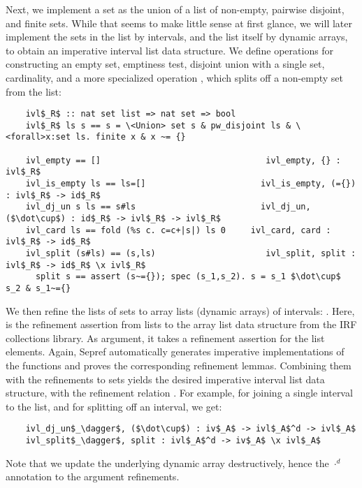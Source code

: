 \documentclass[sn-mathphys,Numbered]{sn-jnl}
\theoremstyle{thmstyleone}%
\theoremstyle{definition}%
\theoremstyle{thmstylethree}%
\begin{document}
  Next, we implement a set as the union of a list of non-empty, pairwise disjoint, and finite sets.
  While that seems to make little sense at first glance, we will later implement the sets in the list by intervals,
  and the list itself by dynamic arrays, to obtain an imperative interval list data structure.
  We define operations for constructing an empty set, emptiness test,
  disjoint union with a single set, cardinality, and a more specialized operation , which splits off
  a non-empty set from the list:
  \begin{lstlisting}
    ivl$_R$ :: nat set list => nat set => bool
    ivl$_R$ ls s == s = \<Union> set s & pw_disjoint ls & \<forall>x:set ls. finite x & x ~= {}

    ivl_empty == []                                 ivl_empty, {} : ivl$_R$
    ivl_is_empty ls == ls=[]                       ivl_is_empty, (={}) : ivl$_R$ -> id$_R$
    ivl_dj_un s ls == s#ls                         ivl_dj_un, ($\dot\cup$) : id$_R$ -> ivl$_R$ -> ivl$_R$
    ivl_card ls == fold (%s c. c=c+|s|) ls 0     ivl_card, card : ivl$_R$ -> id$_R$
    ivl_split (s#ls) == (s,ls)                      ivl_split, split : ivl$_R$ -> id$_R$ \x ivl$_R$
      split s == assert (s~={}); spec (s_1,s_2). s = s_1 $\dot\cup$ s_2 & s_1~={}
  \end{lstlisting}

  We then refine the lists of sets to array lists (dynamic arrays) of intervals: .
  Here,  is the refinement assertion from lists to the array list data structure from the IRF collections library.
  As argument, it takes a refinement assertion for the list elements.
  Again, Sepref automatically generates imperative implementations of the  functions and proves the corresponding
  refinement lemmas. Combining them with the refinements to sets yields the desired imperative interval list data structure,
  with the refinement relation .
  For example, for joining a single interval to the list, and for splitting off an interval, we get:
  \begin{lstlisting}
    ivl_dj_un$_\dagger$, ($\dot\cup$) : iv$_A$ -> ivl$_A$^d -> ivl$_A$
    ivl_split$_\dagger$, split : ivl$_A$^d -> iv$_A$ \x ivl$_A$
  \end{lstlisting}
  Note that we update the underlying dynamic array destructively, hence the $\cdot^d$ annotation to the argument refinements.
\end{document}
